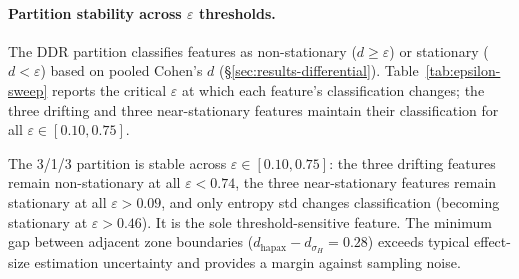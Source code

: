 \paragraph{Partition stability across $\varepsilon$ thresholds.}
\label{app:epsilon-sweep}

The DDR partition classifies features as non-stationary ($d \geq \varepsilon$) or stationary ($d < \varepsilon$) based on pooled Cohen's $d$ (\S\ref{sec:results-differential}).
Table~\ref{tab:epsilon-sweep} reports the critical $\varepsilon$ at which each feature's classification changes; the three drifting and three near-stationary features maintain their classification for all $\varepsilon \in [0.10, 0.75]$.

\begin{table}[ht]
\centering
\small
\caption{Partition stability under varying $\varepsilon$. Critical threshold: the $\varepsilon$ above which a feature is reclassified as stationary. The drifting/near-stationary split is invariant for $\varepsilon \in [0.10, 0.75]$; only entropy std ($d{=}0.46$) changes at $\varepsilon > 0.46$.}
\label{tab:epsilon-sweep}
\end{table}

\noindent The 3/1/3 partition is stable across $\varepsilon \in [0.10, 0.75]$: the three drifting features remain non-stationary at all $\varepsilon < 0.74$, the three near-stationary features remain stationary at all $\varepsilon > 0.09$, and only entropy std changes classification (becoming stationary at $\varepsilon > 0.46$). It is the sole threshold-sensitive feature.
The minimum gap between adjacent zone boundaries ($d_{\text{hapax}} - d_{\sigma_H} = 0.28$) exceeds typical effect-size estimation uncertainty and provides a margin against sampling noise.

